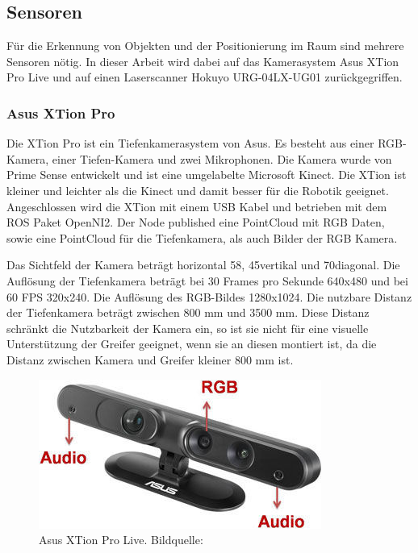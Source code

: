 \subsection{Sensoren}
\label{sec:aufbau-sensoren}
Für die Erkennung von Objekten und der Positionierung im Raum sind mehrere Sensoren nötig. In dieser Arbeit wird dabei auf das Kamerasystem Asus XTion Pro Live und auf einen Laserscanner Hokuyo URG-04LX-UG01 zurückgegriffen.

\subsubsection{Asus XTion Pro}
Die XTion Pro ist ein Tiefenkamerasystem von Asus. Es besteht aus einer RGB-Kamera, einer Tiefen-Kamera und zwei Mikrophonen. Die Kamera wurde von Prime Sense entwickelt und ist eine umgelabelte Microsoft Kinect. Die XTion ist kleiner und leichter als die Kinect und damit besser für die Robotik geeignet. Angeschlossen wird die XTion mit einem USB Kabel und betrieben mit dem ROS Paket OpenNI2. Der Node published eine PointCloud mit RGB Daten, sowie eine PointCloud für die Tiefenkamera, als auch Bilder der RGB Kamera.

Das Sichtfeld der Kamera beträgt horizontal 58\textdegree, 45\textdegree vertikal und 70\textdegree diagonal. Die Auflösung der Tiefenkamera beträgt bei 30 Frames pro Sekunde 640x480 und bei 60 FPS 320x240. Die Auflösung des RGB-Bildes 1280x1024. Die nutzbare Distanz der Tiefenkamera beträgt zwischen 800 mm und 3500 mm.\cite{asus2015} Diese Distanz schränkt die Nutzbarkeit der Kamera ein, so ist sie nicht für eine visuelle Unterstützung der Greifer geeignet, wenn sie an diesen montiert ist, da die Distanz zwischen Kamera und Greifer kleiner 800 mm ist.

\begin{figure}[H]
	\centering
	\includegraphics[scale=0.8]{fig/xtion1}   
	\caption[Asus Xtion Pro Live]{Asus XTion Pro Live. Bildquelle: \cite{asus2015}}
	\label{fig:aufbau-xtion}
\end{figure}

